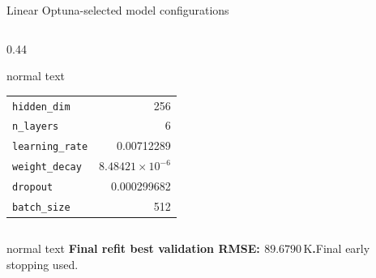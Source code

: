 \documentclass[aspectratio=169,10pt]{beamer}
\begin{document}
\begin{frame}[t]{Linear Optuna-selected model configurations}
\begin{columns}[T,totalwidth=0.94\textwidth]
\begin{column}{0.44\textwidth}
\begin{beamercolorbox}[wd=\linewidth,sep=0.48em]{normal text}
        \vspace{0.08cm}\scriptsize
        \begin{tabular}{@{}lr@{}}
          \texttt{hidden\_dim} & 256\\
          \texttt{n\_layers} & 6\\
          \texttt{learning\_rate} & 0.00712289\\
          \texttt{weight\_decay} & \(8.48421\times10^{-6}\)\\
          \texttt{dropout} & 0.000299682\\
          \texttt{batch\_size} & 512
        \end{tabular}
      \end{beamercolorbox}
    \end{column}
  \end{columns}
  \vspace{0.16cm}
  \begin{beamercolorbox}[wd=0.88\textwidth,sep=0.42em]{normal text}
    \scriptsize\textbf{\color{GVCapacityPurple}Final refit best validation RMSE: \(89.6790\,\mathrm K\).}\quad Final early stopping used.
  \end{beamercolorbox}
\end{frame}
\end{document}
